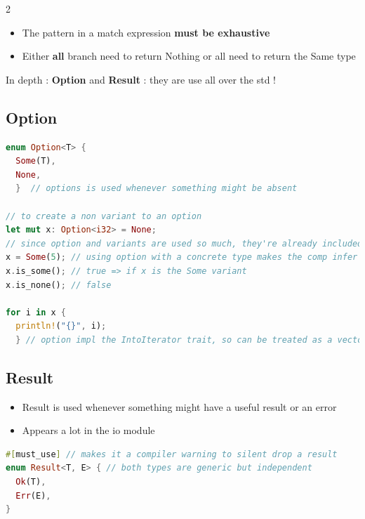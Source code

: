 \documentclass{report}
\begin{document}
\begin{multicols*}{2}
\begin{itemize}
  \item The pattern in a match expression \textbf{must be exhaustive} 
  \item Either \textbf{all} branch need to return Nothing or all need to return the Same type
\end{itemize}

In depth : \textbf{Option} and \textbf{Result} : they are use all over the std !

\subsection{Option}%
\label{sub:Option}

\begin{tcolorbox}[colback=backcolour,size=small,left=4mm]
\begin{lstlisting}[language=rust]
enum Option<T> {
  Some(T),
  None,
  }  // options is used whenever something might be absent

// to create a non variant to an option
let mut x: Option<i32> = None;
// since option and variants are used so much, they're already included in the std prelude, no need to "use"
x = Some(5); // using option with a concrete type makes the comp infer the type => we can leave off the declaration Option<i32>
x.is_some(); // true => if x is the Some variant
x.is_none(); // false

for i in x {
  println!("{}", i);
  } // option impl the IntoIterator trait, so can be treated as a vector of 0 or 1 items 
\end{lstlisting}
\end{tcolorbox}

\subsection{Result}%
\label{sub:Result}

\begin{itemize}
  \item Result is used whenever something might have a useful result or an error 
  \item Appears a lot in the io module
\end{itemize}

\begin{tcolorbox}[title=Definition,colback=backcolour,size=small,left=4mm]
\begin{lstlisting}[language=rust]
#[must_use] // makes it a compiler warning to silent drop a result
enum Result<T, E> { // both types are generic but independent
  Ok(T),
  Err(E),
}
\end{lstlisting}
\end{tcolorbox}


\end{multicols*}
\end{document}
